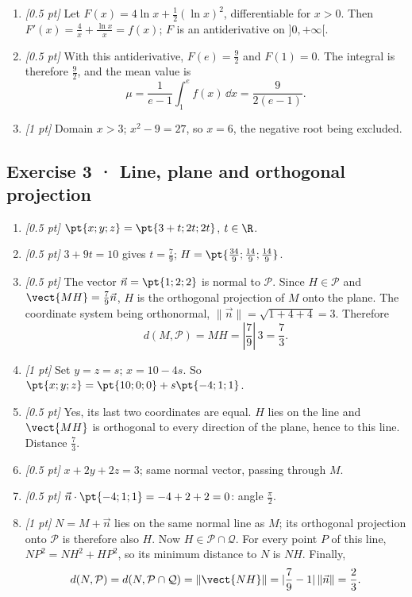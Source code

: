 \begin{enumerate}
\item \textit{[0.5 pt]} Let $F(x)=4\ln x+\frac12(\ln x)^2$, differentiable for $x>0$. Then $F'(x)=\frac{4}{x}+\frac{\ln x}{x}=f(x)$; $F$ is an antiderivative on $]0,+\infty[$.

\item \textit{[0.5 pt]} With this antiderivative, $F(e)=\frac{9}{2}$ and $F(1)=0$. The integral is therefore $\frac{9}{2}$, and the mean value is
\[\mu=\frac{1}{e-1}\int_1^e f(x)\,\dd x=\frac{9}{2(e-1)}.\]

\item \textit{[1 pt]} Domain $x>3$; $x^2-9=27$, so $x=6$, the negative root being excluded.

\end{enumerate}

\subsection*{Exercise 3 · Line, plane and orthogonal projection}\begin{enumerate}

\item \textit{[0.5 pt]} $\pt{x;y;z}=\pt{3+t;2t;2t}$, $t\in\R$.

\item \textit{[0.5 pt]} $3+9t=10$ gives $t=\frac{7}{9}$; $H=\pt{\frac{34}{9};\frac{14}{9};\frac{14}{9}}$.

\item \textit{[0.5 pt]} The vector $\vec n=\pt{1;2;2}$ is normal to $\mathcal P$. Since $H\in\mathcal P$ and $\vect{MH}=\frac{7}{9}\vec n$, $H$ is the orthogonal projection of $M$ onto the plane. The coordinate system being orthonormal, $\|\vec n\|=\sqrt{1+4+4}=3$. Therefore
\[d(M,\mathcal P)=MH=|\frac{7}{9}|\,3=\frac{7}{3}.\]

\item \textit{[1 pt]} Set $y=z=s$; $x=10-4s$. So $\pt{x;y;z}=\pt{10;0;0}+s\pt{-4;1;1}$.

\item \textit{[0.5 pt]} Yes, its last two coordinates are equal. $H$ lies on the line and $\vect{MH}$ is orthogonal to every direction of the plane, hence to this line. Distance $\frac{7}{3}$.

\item \textit{[0.5 pt]} $x+2y+2z=3$; same normal vector, passing through $M$.

\item \textit{[0.5 pt]} $\vec n\cdot\pt{-4;1;1}=-4+2+2=0$: angle $\frac{\pi}{2}$.

\item \textit{[1 pt]} $N=M+\vec n$ lies on the same normal line as $M$; its orthogonal projection onto $\mathcal P$ is therefore also $H$. Now $H\in\mathcal P\cap\mathcal Q$. For every point $P$ of this line, $NP^2=NH^2+HP^2$, so its minimum distance to $N$ is $NH$. Finally,
\[d(N,\mathcal P)=d(N,\mathcal P\cap\mathcal Q)=\|\vect{NH}\|=|\frac{7}{9}-1|\,\|\vec n\|=\frac{2}{3}.\]

\end{enumerate}

